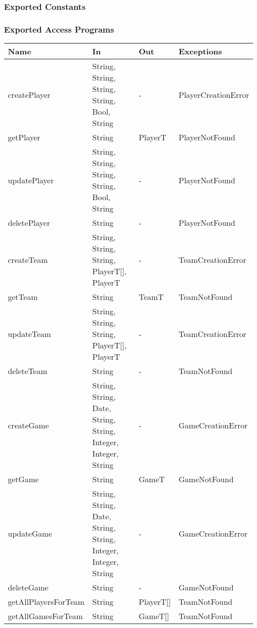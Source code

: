 \documentclass[12pt, titlepage]{article}
\begin{document}
\begin{itemize}
\subsubsection{Exported Constants}

\subsubsection{Exported Access Programs}

\begin{center}
  \begin{tabular}{|p{4cm}| p{4cm}| p{4cm} | p{3cm}|}
    \hline
    \textbf{Name}        & \textbf{In}                                                    & \textbf{Out} & \textbf{Exceptions} \\
    \hline
    createPlayer         & String, String, String, String, Bool, String                   & -            & PlayerCreationError \\
    getPlayer            & String                                                         & PlayerT      & PlayerNotFound      \\
    updatePlayer         & String, String, String, String, Bool, String                   & -            & PlayerNotFound      \\
    deletePlayer         & String                                                         & -            & PlayerNotFound      \\
    createTeam           & String, String, String, PlayerT[], PlayerT                     & -            & TeamCreationError   \\
    getTeam              & String                                                         & TeamT        & TeamNotFound        \\
    updateTeam           & String, String, String, PlayerT[], PlayerT                     & -            & TeamCreationError   \\
    deleteTeam           & String                                                         & -            & TeamNotFound        \\
    createGame           & String, String, Date, String, String, Integer, Integer, String & -            & GameCreationError   \\
    getGame              & String                                                         & GameT        & GameNotFound        \\
    updateGame           & String, String, Date, String, String, Integer, Integer, String & -            & GameCreationError   \\
    deleteGame           & String                                                         & -            & GameNotFound        \\
    getAllPlayersForTeam & String                                                         & PlayerT[]    & TeamNotFound        \\
    getAllGamesForTeam   & String                                                         & GameT[]      & TeamNotFound        \\
    \hline
  \end{tabular}
\end{center}


\end{itemize}
\end{document}
